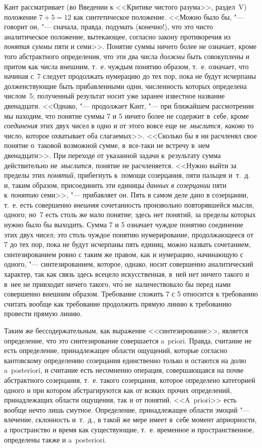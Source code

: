 Кант рассматривает (во Введении к <<Критике чистого разума>>, раздел~V)
положение $7+5=12$ как синтетическое положение. <<Можно было бы, "---
говорит он, "--- сначала, правда, подумать (конечно!), что это чисто
аналитическое положение, вытекающее, согласно закону противоречия из
{\em понятия суммы} пяти и семи>>. Понятие суммы ничего более не означает,
кроме того абстрактного определения, что эти два числа {\em должны} быть
совокуплены и притом как числа внешним, т.~е. чуждым понятию образом, т.~е.
означает, что начиная с~7 следует продолжать нумерацию до тех пор, пока не
будут исчерпаны долженствующие быть прибавленными одни, численность которых
определена числом~5; полученный результат носит уже заранее известное название
двенадцати. <<Однако, "--- продолжает Кант, "--- при ближайшем рассмотрении мы
находим, что понятие суммы 7 и 5 ничего более не содержит в~себе, кроме
{\em соединения} этих двух чисел в одно и от этого вовсе еще
не~{\em мыслится, каково} то число, которое охватывает оба слагаемых>>.
<<Сколько бы я ни расчленял свое понятие о~таковой возможной сумме,
я~все-таки не встречу в~нем двенадцати>>. При переходе от указанной задачи
к~результату сумма действительно не~{\em мыслится}, понятие не расчленяется.
<<Нужно выйти за пределы этих {\em понятий}, прибегнуть к~помощи
созерцания, пяти пальцев и~т.~д. и, таким образом, присоединить эти
единицы {\em данных в созерцании} пяти к~{\em понятию} семи>>, "--- прибавляет
он. Пять в самом деле дано в созерцании, т.~е. есть совершенно {\em внешняя}
сочетанность произвольно повторявшейся мысли, одного; но~7 есть столь же мало
понятие; здесь нет понятий, за пределы которых нужно было бы выходить. Сумма
7 и 5 означает чуждое понятию соединение этих двух чисел; это столь чуждое
понятию нумерирование, продолжающееся от 7 до тех пор, пока не будут исчерпаны
пять единиц, можно назвать сочетанием, синтезированием ровно с таким же правом,
как и нумерацию, начинающую с одного, "--- синтезированием, которое, однако,
носит совершенно аналитический характер, так как связь здесь всецело
искусственная, в~ней нет ничего такого и в~нее не привходит ничего такого,
чт\'{о} не~наличествовало бы перед нами совершенно внешним образом. Требование
сложить 7 с 5 относится к требованию считать вообще как требование продолжить
прямую линию к требованию провести прямую линию.

Таким же бессодержательным, как выражение <<синтезирование>>, является
определение, что это синтезирование совершается a~priori. Правда, считание не
есть определение, принадлежащее области ощущений, которые согласно кантовскому
определению созерцания единственно только и остаются на долю a~poste\-riori, и
считание есть несомненно операция, совершающаяся на почве абстрактного
созерцания, т.~е. такого созерцания, которое определено категорией одного и при
котором абстрагируются как от всяких прочих определений, принадлежащих области
ощущения, так и от понятий. <<A~priori>> есть вообще нечто лишь смутное.
Определение, принадлежащее области эмоций "--- влечение, склонность и~т.~д.,
в такой же мере имеет в~себе момент априорности, а пространство и время как
существующие, т.~е. временное и пространственное, определены также и
a~poste\-ri\-ori.

